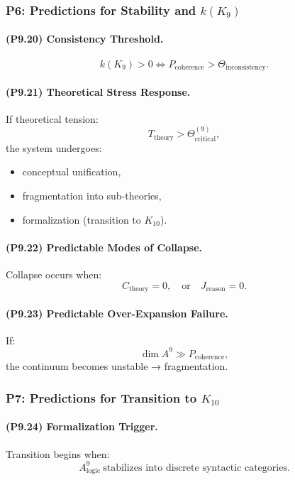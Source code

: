 \subsubsection{P6: Predictions for Stability and \texorpdfstring{$k(K_9)$}{k(K_9)}}

\paragraph{(P9.20) Consistency Threshold.}
\[
k(K_9) > 0 
\iff 
P_{\mathrm{coherence}} > \Theta_{\mathrm{inconsistency}}.
\]

\paragraph{(P9.21) Theoretical Stress Response.}
If theoretical tension:
\[
T_{\mathrm{theory}} > \Theta_{\mathrm{critical}}^{(9)},
\]
the system undergoes:
\begin{itemize}
    \item conceptual unification,
    \item fragmentation into sub-theories,
    \item formalization (transition to $K_{10}$).
\end{itemize}

\paragraph{(P9.22) Predictable Modes of Collapse.}
Collapse occurs when:
\[
C_{\mathrm{theory}} = 0,
\quad \text{or} \quad
J_{\mathrm{reason}} = 0.
\]

\paragraph{(P9.23) Predictable Over-Expansion Failure.}
If:
\[
\dim A^9 \gg P_{\mathrm{coherence}},
\]
the continuum becomes unstable → fragmentation.

\subsubsection{P7: Predictions for Transition to $K_{10}$}

\paragraph{(P9.24) Formalization Trigger.}
Transition begins when:
\[
A_{\mathrm{logic}}^9 
\ \text{stabilizes into discrete syntactic categories}.
\]

